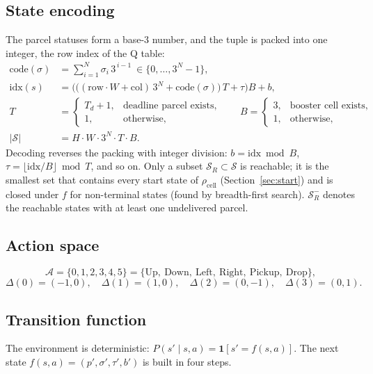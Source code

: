 \documentclass[11pt]{article}
\newcommand{\Sset}{\mathcal{S}}
\newcommand{\Aset}{\mathcal{A}}
\newcommand{\ind}[1]{\mathbf{1}\!\left[#1\right]}
\begin{document}
\subsection{State encoding}
The parcel statuses form a base-3 number, and the tuple is packed into one integer, the row index of the Q table:
\begin{align}
\mathrm{code}(\sigma) &= \sum_{i=1}^{N}\sigma_i\,3^{\,i-1}\ \in\{0,\dots,3^N-1\},\\
\mathrm{idx}(s) &= \Big(\big((\mathrm{row}\cdot W+\mathrm{col})\,3^{N}+\mathrm{code}(\sigma)\big)\,T+\tau\Big)B+b,\\
T &= \begin{cases}T_d+1, & \text{deadline parcel exists},\\ 1, & \text{otherwise},\end{cases}\qquad
B = \begin{cases}3, & \text{booster cell exists},\\ 1, & \text{otherwise},\end{cases}\\
|\Sset| &= H\cdot W\cdot 3^{N}\cdot T\cdot B .
\end{align}
Decoding reverses the packing with integer division: $b=\mathrm{idx}\bmod B$, $\tau=\lfloor\mathrm{idx}/B\rfloor\bmod T$, and so on. Only a subset $\Sset_R\subset\Sset$ is reachable; it is the smallest set that contains every start state of $\rho_{\mathrm{cell}}$ (Section~\ref{sec:start}) and is closed under $f$ for non-terminal states (found by breadth-first search). $\Sset_R^{-}$ denotes the reachable states with at least one undelivered parcel.

\subsection{Action space}
\begin{equation}
\Aset=\{0,1,2,3,4,5\}=\{\text{Up},\ \text{Down},\ \text{Left},\ \text{Right},\ \text{Pickup},\ \text{Drop}\},
\end{equation}
\begin{equation}
\Delta(0)=(-1,0),\quad \Delta(1)=(1,0),\quad \Delta(2)=(0,-1),\quad \Delta(3)=(0,1).
\end{equation}

\subsection{Transition function}
The environment is deterministic: $P(s'\mid s,a)=\ind{s'=f(s,a)}$. The next state $f(s,a)=(p',\sigma',\tau',b')$ is built in four steps.
\end{document}
